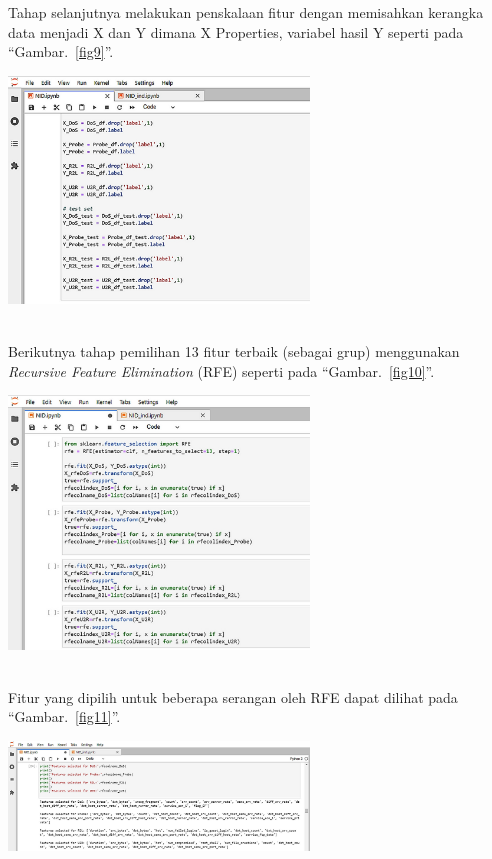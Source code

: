 \documentclass[conference]{IEEEtran}
\begin{document}
Tahap selanjutnya melakukan penskalaan fitur dengan memisahkan kerangka data menjadi X dan Y dimana X Properties, variabel hasil Y seperti pada ``Gambar.~\ref{fig9}''.\\

\begin{minipage}{\linewidth}
\centerline{\includegraphics[width=80mm]{Gambar/Gbr08.jpg}}
\label{fig9}
\end{minipage}\\

Berikutnya tahap pemilihan 13 fitur terbaik (sebagai grup) menggunakan \emph{Recursive Feature Elimination} (RFE) seperti pada ``Gambar.~\ref{fig10}''.\\

\begin{minipage}{\linewidth}
\centerline{\includegraphics[width=80mm]{Gambar/Gbr09.jpg}}
\label{fig10}
\end{minipage}\\

Fitur yang dipilih untuk beberapa serangan oleh RFE dapat dilihat pada ``Gambar.~\ref{fig11}''.\\

\begin{minipage}{\linewidth}
\centerline{\includegraphics[width=80mm]{Gambar/Gbr10.jpg}}
\label{fig11}
\end{minipage}\\
\end{document}
